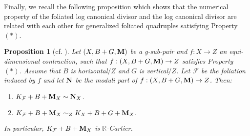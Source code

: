 \documentclass[11pt]{amsart}
\numberwithin{equation}{section}
\newcommand{\Mm}{{\bf{M}}}
\newcommand{\Nn}{{\bf{N}}}
\newcommand{\Rr}{\mathbb{R}}
\newcommand{\Ff}{\mathcal{F}}
\newtheorem{prop}[thm]{Proposition}
\theoremstyle{definition}
\theoremstyle{definition}
\theoremstyle{definition}
\begin{document}
Finally, we recall the following proposition which shows that the numerical property of the foliated log canonical divisor and the log canonical divisor are related with each other for generalized foliated quadruples satisfying Property $(*)$.

\begin{prop}[cf. {\cite[Proposition 3.6]{ACSS21}}]\label{prop: weak cbf gfq}
Let $(X,B+G,\Mm)$ be a g-sub-pair and $f: X\rightarrow Z$ an equi-dimensional contraction, such that $f: (X,B+G,\Mm)\rightarrow Z$ satisfies Property $(*)$. Assume that $B$ is horizontal$/Z$ and $G$ is vertical$/Z$. Let $\Ff$ be the foliation induced by $f$ and let $\Nn$ be the moduli part of $f: (X,B+G,\Mm)\rightarrow Z$. Then:
\begin{enumerate}
  \item $K_{\Ff}+B+\Mm_X\sim \Nn_X$.
  \item $K_{\Ff}+B+\Mm_X\sim_{Z}K_X+B+G+\Mm_X.$
\end{enumerate}
In particular, $K_{\Ff}+B+\Mm_X$ is $\Rr$-Cartier.
\end{prop}
\end{document}
